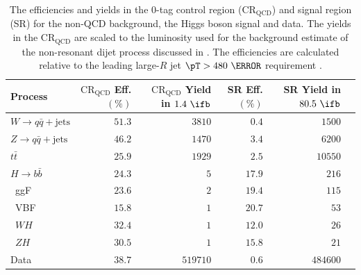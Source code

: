\begin{table}[htpb]
 \centering
 \caption{The efficiencies and yields in the $0$-tag control region ($\text{CR}_{\text{QCD}}$) and signal region (SR) for the non-QCD background, the Higgs boson signal and data. The yields in the $\text{CR}_{\text{QCD}}$ are scaled to the luminosity used for the background estimate of the non-resonant dijet process discussed in . The efficiencies are calculated relative to the leading large-$R$ jet $\pT > 480~\GeV$ requirement \cite{Alison:2649017}.}
 \begin{adjustbox}{max width=\textwidth}
  \begin{tabular}{@{}lrrrrr@{}}
   \toprule
   Process                             & $\text{CR}_{\text{QCD}}$ Eff. $(\%)$ & $\text{CR}_{\text{QCD}}$ Yield in $1.4~\ifb$ & SR Eff. $(\%)$ & SR Yield in $80.5~\ifb$ \\ \midrule
   $W \to q\bar{q} + \text{jets}$    & $51.3$               & $3810$                       & $0.4$          & $1500$                  \\
   $Z \to q\bar{q} + \text{jets}$    & $46.2$               & $1470$                       & $3.4$          & $6200$                  \\
   $t\bar{t}$                          & $25.9$               & $1929$                       & $2.5$          & $10550$                 \\
   $H \rightarrow b\bar{b}$                              & $24.3$               & $5$                          & $17.9$         & $216$                   \\
   \phantom{$H \rightarrow b\bar{b}$\quad}~ggF           & $23.6$               & $2$                          & $19.4$         & $115$                   \\
   \phantom{$H \rightarrow b\bar{b}$\quad}~VBF           & $15.8$               & $1$                          & $20.7$         & $53$                    \\
   \phantom{$H \rightarrow b\bar{b}$\quad}~$WH$          & $32.4$               & $1$                          & $12.0$         & $26$                    \\
   \phantom{$H \rightarrow b\bar{b}$\quad}~$ZH$          & $30.5$               & $1$                          & $15.8$         & $21$                    \\
   Data                                & $38.7$               & $519710$                     & $0.6$          & $484600$                \\
   \bottomrule
  \end{tabular}
 \end{adjustbox}
 \label{table:efficiencies_and_yields}
\end{table}

